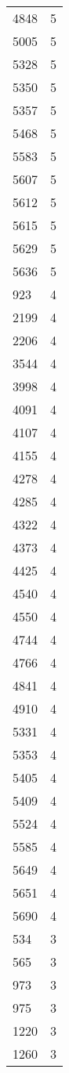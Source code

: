 \begin{table}[ht]
\begin{tabular}{lr}
  4848 &   5 \\ 
  5005 &   5 \\ 
  5328 &   5 \\ 
  5350 &   5 \\ 
  5357 &   5 \\ 
  5468 &   5 \\ 
  5583 &   5 \\ 
  5607 &   5 \\ 
  5612 &   5 \\ 
  5615 &   5 \\ 
  5629 &   5 \\ 
  5636 &   5 \\ 
  923 &   4 \\ 
  2199 &   4 \\ 
  2206 &   4 \\ 
  3544 &   4 \\ 
  3998 &   4 \\ 
  4091 &   4 \\ 
  4107 &   4 \\ 
  4155 &   4 \\ 
  4278 &   4 \\ 
  4285 &   4 \\ 
  4322 &   4 \\ 
  4373 &   4 \\ 
  4425 &   4 \\ 
  4540 &   4 \\ 
  4550 &   4 \\ 
  4744 &   4 \\ 
  4766 &   4 \\ 
  4841 &   4 \\ 
  4910 &   4 \\ 
  5331 &   4 \\ 
  5353 &   4 \\ 
  5405 &   4 \\ 
  5409 &   4 \\ 
  5524 &   4 \\ 
  5585 &   4 \\ 
  5649 &   4 \\ 
  5651 &   4 \\ 
  5690 &   4 \\ 
  534 &   3 \\ 
  565 &   3 \\ 
  973 &   3 \\ 
  975 &   3 \\ 
  1220 &   3 \\ 
  1260 &   3 \\ 

\end{tabular}
\end{table}
